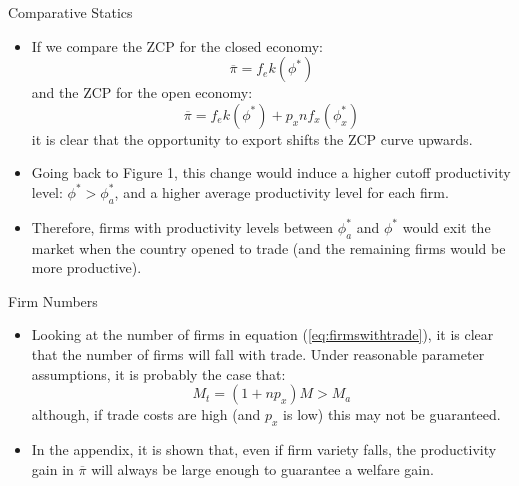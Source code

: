 \documentclass[aspectratio=169]{beamer}
\begin{document}
\begin{frame}{Comparative Statics}

\begin{itemize}
    \item<1-> If we compare the ZCP for the closed economy:
    \begin{equation*}
        \overline{\pi} = f_{e} k\left( \phi^{*} \right)
    \end{equation*}
    and the ZCP for the open economy:
    \begin{equation*}
        \overline{\pi} = f_{e} k\left( \phi^{*} \right) + p_{x} n f_{x}\left( \phi_{x}^{*} \right)
    \end{equation*}
    it is clear that the opportunity to export shifts the ZCP curve upwards.
    \item<2-> Going back to Figure 1, this change would induce a higher cutoff productivity level: $ \phi^{*} > \phi_{a}^{*} $, and a higher average productivity level for each firm.
    \item<3-> Therefore, firms with productivity levels between $ \phi_{a}^{*} $ and $ \phi^{*} $ would exit the market when the country opened to trade (and the remaining firms would be more productive).
\end{itemize}
    
\end{frame}


\begin{frame}{Firm Numbers}

\begin{itemize}
    \item<1-> Looking at the number of firms in equation (\ref{eq:firmswithtrade}), it is clear that the number of firms will fall with trade.  Under reasonable parameter assumptions, it is probably the case that:
    \begin{equation*}
        M_{t} = \left( 1 + n p_{x} \right) M > M_{a}
    \end{equation*}
    although, if trade costs are high (and $ p_{x} $ is low) this may not be guaranteed.
    \item<2-> In the appendix, it is shown that, even if firm variety falls, the productivity gain in $ \overline{\pi} $ will always be large enough to guarantee a welfare gain. 
\end{itemize}
    
\end{frame}
\end{document}
